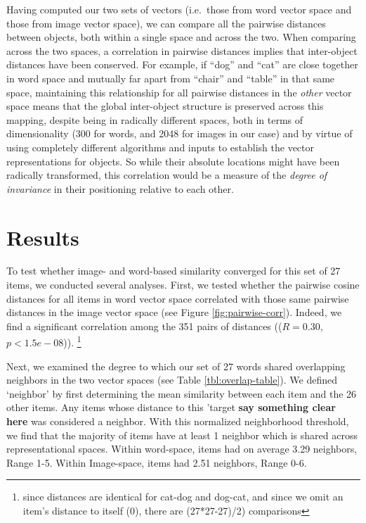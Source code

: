 \documentclass[10pt, letterpaper]{article}
\begin{document}
Having computed our two sets of vectors (i.e.~those from word vector
space and those from image vector space), we can compare all the
pairwise distances between objects, both within a single space and
across the two. When comparing across the two spaces, a correlation in
pairwise distances implies that inter-object distances have been
conserved. For example, if ``dog'' and ``cat'' are close together in
word space and mutually far apart from ``chair'' and ``table'' in that
same space, maintaining this relationship for all pairwise distances in
the \textit{other} vector space means that the global inter-object
structure is preserved across this mapping, despite being in radically
different spaces, both in terms of dimensionality (300 for words, and
2048 for images in our case) and by virtue of using completely different
algorithms and inputs to establish the vector representations for
objects. So while their absolute locations might have been radically
transformed, this correlation would be a measure of the
\textit{degree of invariance} in their positioning relative to each
other.

\section{Results}\label{results}

To test whether image- and word-based similarity converged for this set
of 27 items, we conducted several analyses. First, we tested whether the
pairwise cosine distances for all items in word vector space correlated
with those same pairwise distances in the image vector space (see Figure
\ref{fig:pairwise-corr}). Indeed, we find a significant correlation
among the 351 pairs of distances ((\(R = 0.30\), \(p < 1.5e-08\))).
\footnote{since distances are identical for cat-dog and dog-cat, and since we omit an item's distance to itself (0), there are (27*27-27)/2) comparisons}

Next, we examined the degree to which our set of 27 words shared
overlapping neighbors in the two vector spaces (see Table
\ref{tbl:overlap-table}). We defined `neighbor' by first determining the
mean similarity between each item and the 26 other items. Any items
whose distance to this 'target \textbf{say something clear here} was
considered a neighbor. With this normalized neighborhood threshold, we
find that the majority of items have at least 1 neighbor which is shared
across representational spaces. Within word-space, items had on average
3.29 neighbors, Range 1-5. Within Image-space, items had 2.51 neighbors,
Range 0-6.
\end{document}
